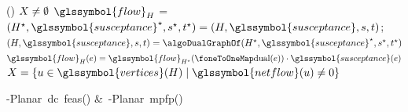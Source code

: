 \begin{algorithm}[tb!]
\While()
{$X\not=\emptyset$}
{ %
    $\glssymbol{flow}_{\subgraph}$ = \hspace*{-1mm}%
    \label{ch:network-analyzes:algo:stpf:ResolveKclConflict}\;
    $(\subgraph^\star, \glssymbol{susceptance}^\star, \source^\star,
    \sink^\star) = (\subgraph, \glssymbol{susceptance}, \source, \sink)$;
    $(\subgraph, \glssymbol{susceptance}, \source, \sink) 
    = 
    \algoDualGraphOf(\subgraph^\star, \glssymbol{susceptance}^\star,
    \source^\star, \sink^\star)$\;
    \label{ch:network-analyzes:algo:stpf:constructDualGraph:2}
    $\glssymbol{flow}_\subgraph(\edge) = \glssymbol{flow}_{\subgraph^\star}(\oneToOneMap(\edge))\cdot\glssymbol{susceptance}
    (\edge)$\;
    \label{ch:network-analyzes:algo:stpf:flowOneToOneMapping:2}
    $\excessSet = \{\vertexa\in\glssymbol{vertices}(\subgraph)\mid
    \glssymbol{netflow}
    (\vertexa)\not=0\}$\hspace*{-1mm}%
    \label{ch:network-analyzes:algo:stpf:set-of-vertices-with-excess:2}
}
\caption{\source-\sink Planar~\gls{dc}~\gls{feas}()
 \&~\source-\sink Planar~\gls{mpfp}()}
\label{ch:network-analyzes:algo:s-t-power-flow-algorithm}%
\end{algorithm}%
% 
